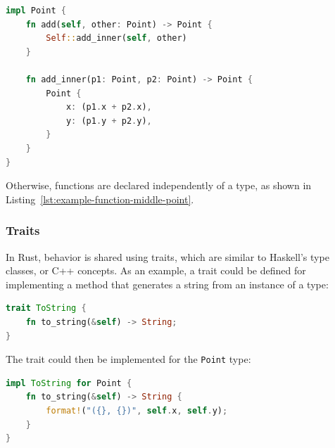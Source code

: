 \documentclass{article}
\begin{document}
\begin{lstlisting}[language=Rust, style=boxed, caption=Associating behavior with the point defined in Listing~\ref{lst:example-struct}, label=lst:example-struct-methods]
impl Point {
    fn add(self, other: Point) -> Point {
        Self::add_inner(self, other)
    }

    fn add_inner(p1: Point, p2: Point) -> Point {
        Point {
            x: (p1.x + p2.x),
            y: (p1.y + p2.y),
        }
    }
}
\end{lstlisting}

Otherwise, functions are declared independently of a type, as shown in Listing~\ref{lst:example-function-middle-point}.

\subsubsection{Traits}
In Rust, behavior is shared using traits, which are similar to Haskell’s type classes, or C++ concepts. As an example, a trait could be defined for implementing a method that generates a string from an instance of a type:

\begin{lstlisting}[language=Rust, style=boxed, caption=Trait definition, label=lst:example-trait]
trait ToString {
    fn to_string(&self) -> String;
}
\end{lstlisting}

The trait could then be implemented for the \lstinline{Point} type:

\begin{lstlisting}[language=Rust, style=boxed, caption=Trait implementation for the \lstinline{Point} type, label=lst:example-trait-implementation]
impl ToString for Point {
    fn to_string(&self) -> String {
        format!("({}, {})", self.x, self.y);
    }
}
\end{lstlisting}


\end{document}
